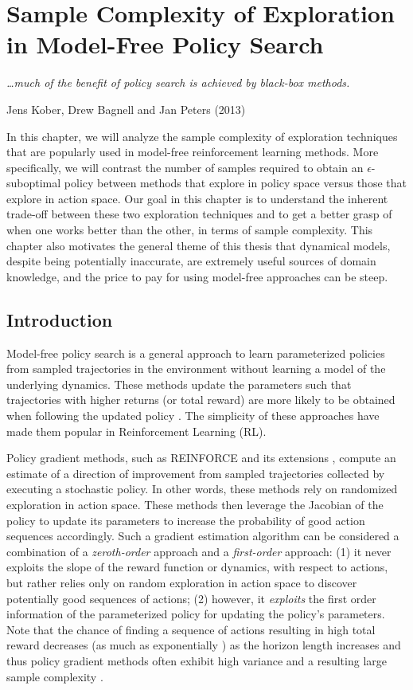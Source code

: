 
\chapter{Sample Complexity of Exploration in Model-Free Policy Search}
\label{cha:sample-compl-expl}

\epigraph{\textit{\ldots much of the benefit of policy search is achieved
by black-box methods.}}{Jens Kober, Drew Bagnell and Jan Peters
(2013)}

In this chapter, we will analyze the sample complexity of exploration
techniques that are popularly used in model-free reinforcement
learning methods. More specifically, we will contrast the number of
samples required to obtain an $\epsilon$-suboptimal policy between
methods that explore in policy space versus those that explore in
action space. Our goal in this chapter is to understand the
inherent trade-off between these two exploration techniques and to get
a better grasp of when one works better than the other, in terms of
sample complexity. This chapter also motivates the general theme of
this thesis that dynamical models, despite being potentially
inaccurate, are extremely useful sources of domain knowledge, and the
price to pay for using model-free approaches can be steep.

\section{Introduction}
Model-free policy search is a general approach to learn parameterized
policies from sampled trajectories in the environment without
learning a model of the underlying dynamics. These methods
update the parameters such that trajectories with higher returns (or total reward) are
more likely to be obtained when following the updated policy
\citep{kober2013reinforcement}. The simplicity of these approaches have
made them popular in Reinforcement Learning (RL).

Policy gradient methods, such as REINFORCE \citep{williams1992simple}
and its extensions \citep{kakade2002natural,bagnell2004policy, silver2014deterministic,schulman2015trust},
compute an estimate of a direction of improvement from sampled
trajectories collected by executing a stochastic policy. In other words, these methods rely on
randomized exploration in action space. These methods then leverage
the Jacobian of the policy to update its parameters to increase the
probability of good action sequences accordingly. Such a gradient
estimation algorithm can be considered a combination of a
\textit{zeroth-order} approach and a \textit{first-order} approach:
(1) it never exploits the slope of the reward function or dynamics,
with respect to actions, but rather relies only on random exploration
in action space to discover potentially good sequences of actions; (2)
however, it \emph{exploits} the first order information of the
parameterized policy for updating the policy's parameters. Note that
the chance of finding a sequence of actions resulting in high total
reward decreases (as much as exponentially
\citep{kakade2002approximately}) as the horizon length increases and
thus policy gradient methods often exhibit high variance and a
resulting large sample complexity \citep{peters2008reinforcement,
  zhao2011analysis}.

